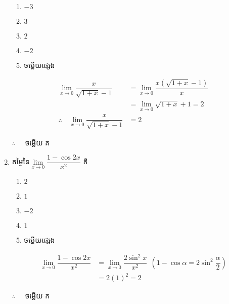 \documentclass[a4paper,12pt]{article}
\begin{document}
\begin{enumerate}[m]
	\begin{enumerate}[k,5]
		\item $-3$
		\item $3$
		\item $2$
		\item $-2$
		\item ចម្លើយផ្សេង
	\end{enumerate}
	\answer
	\begin{align*}
		\lim\limits_{x\to0}\dfrac{x}{\sqrt{1+x}-1} &= 	\lim\limits_{x\to0}\dfrac{x\left(\sqrt{1+x}-1\right)}{x} \\
		&=\lim\limits_{x\to0}\sqrt{1+x}+1 = 2\\
		\therefore \quad \lim\limits_{x\to0}\dfrac{x}{\sqrt{1+x}-1} &= 2
	\end{align*}
	\begin{center}
		$\therefore \quad$ \kml ចម្លើយ \kbk គ
	\end{center}
	\newpage
	\item តម្លៃនៃ$\lim\limits_{x\to0}\dfrac{1-\cos2x}{x^2}$ គឺ
		\begin{enumerate}[k,5]
			\item $2$
			\item $1$
			\item $-2$
			\item $1$
			\item ចម្លើយផ្សេង
		\end{enumerate}
		\answer
		\begin{align*}
			\lim\limits_{x\to0}\dfrac{1-\cos2x}{x^2} &=
			\lim\limits_{x\to0}\dfrac{2\sin^2x}{x^2}~~\left(1-\cos\alpha=2\sin^2\dfrac{\alpha}{2}\right)\\
			&=2\left(1\right)^2=2
		\end{align*}
		\begin{center}
			$\therefore \quad$ \kml ចម្លើយ \kbk ក
		\end{center}
		{\color{blue}\hrulefill}
	

\end{enumerate}
\end{document}
